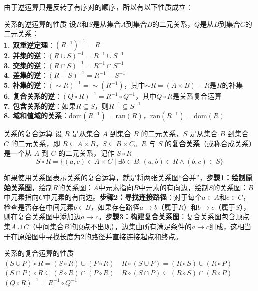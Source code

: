 \documentclass[lang=cn,11pt]{elegantbook}
\begin{document}
由于逆运算只是反转了有序对的顺序，所以有以下性质成立：
\begin{theorem}{关系的逆运算的性质}
设$R$和$S$是从集合$A$到集合$B$的二元关系，$Q$是从$B$到集合$C$的二元关系：\\
\textbf{1. 双重逆定理}：$(R^{-1})^{-1} = R$\\
\textbf{2. 并集的逆}：$(R \cup S)^{-1} = R^{-1} \cup S^{-1}$\\
\textbf{3. 交集的逆}：$(R \cap S)^{-1} = R^{-1} \cap S^{-1}$\\
\textbf{4. 差集的逆}：$(R - S)^{-1} = R^{-1} - S^{-1}$\\
\textbf{5. 补集的逆}：$(\sim R)^{-1} = \sim (R^{-1})$，其中$\sim R = (A \times B) - R$是$R$的补集\\
\textbf{6. 复合关系的逆}：$(Q \circ R)^{-1} = R^{-1} \circ Q^{-1}$，其中$Q \circ R$是关系复合运算\\
\textbf{7. 包含关系的逆}：如果$R \subseteq S$，则$R^{-1} \subseteq S^{-1}$\\
\textbf{8. 域和值域的关系}：$\text{dom}(R^{-1}) = \text{ran}(R)$，$\text{ran}(R^{-1}) = \text{dom}(R)$
\end{theorem}
\begin{definition}{关系的复合运算}
设 $R$ 是从集合 $A$ 到集合 $B$ 的二元关系，$S$ 是从集合 $B$ 到集合 $C$ 的二元关系，即 $R \subseteq A \times B$，$S \subseteq B \times C$。$R$ 与 $S$ 的\textbf{复合关系}（或称合成关系）是一个从 $A$ 到 $C$ 的二元关系，记作 $S \circ R$\vspace{-10pt}
\[
S \circ R = \{(a, c)\in A \times C \mid \exists b \in B : (a, b) \in R \land (b, c) \in S\}
\]
\end{definition}
如果使用关系图表示关系的复合运算，就是将两张关系图“合并”，\textbf{步骤1：绘制原始关系图}，绘制$R$的关系图：$A$中元素指向$B$中元素的有向边，绘制$S$的关系图：$B$中元素指向$C$中元素的有向边。\textbf{步骤2：寻找连接路径}：对于每个$a \in A$和$c \in C$，检查是否存在中间元素$b \in B$，如果存在路径$a \rightarrow b$（属于$R$）和$b \rightarrow c$（属于$S$），则在复合关系图中添加边$a \rightarrow c$。\textbf{步骤3：构建复合关系图}：复合关系图包含顶点集$A \cup C$（中间集合$B$的顶点不出现），边集由所有满足条件的$a \rightarrow c$组成，这相当于在原始图中寻找长度为2的路径并直接连接起点和终点。
\begin{theorem}{关系的复合运算的性质}
    $(S\cup P)\circ R=(S\circ R)\cup(P\circ R)\quad R\circ(S\cup P)=(R\circ S)\cup(R\circ P)$\\
    $(S\cap P)\circ R\subseteq(S\circ R)\cap(P\circ R)\quad R\circ(S\cap P)\subseteq(R\circ S)\cap(R\circ P)$\\
    $(Q \circ R)^{-1} = R^{-1} \circ Q^{-1}$
\end{theorem}
\end{document}
